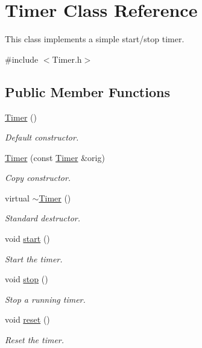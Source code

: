 \hypertarget{class_timer}{}\section{Timer Class Reference}
\label{class_timer}


This class implements a simple start/stop timer.  




{\ttfamily \#include $<$Timer.\+h$>$}

\subsection*{Public Member Functions}
\begin{DoxyCompactItemize}
\item 
\hyperlink{class_timer_a5f16e8da27d2a5a5242dead46de05d97}{Timer} ()
\begin{DoxyCompactList}\small\item\em Default constructor. \end{DoxyCompactList}\item 
\hyperlink{class_timer_a7d1cfb6025c20ad0d56fea2e09a169ec}{Timer} (const \hyperlink{class_timer}{Timer} \&orig)
\begin{DoxyCompactList}\small\item\em Copy constructor. \end{DoxyCompactList}\item 
virtual \hyperlink{class_timer_a14fa469c4c295c5fa6e66a4ad1092146}{$\sim$\+Timer} ()
\begin{DoxyCompactList}\small\item\em Standard destructor. \end{DoxyCompactList}\item 
void \hyperlink{class_timer_a3a8b5272198d029779dc9302a54305a8}{start} ()
\begin{DoxyCompactList}\small\item\em Start the timer. \end{DoxyCompactList}\item 
void \hyperlink{class_timer_a63f0eb44b27402196590a03781515dba}{stop} ()
\begin{DoxyCompactList}\small\item\em Stop a running timer. \end{DoxyCompactList}\item 
void \hyperlink{class_timer_a9020542d73357a4eef512eefaf57524b}{reset} ()
\begin{DoxyCompactList}\small\item\em Reset the timer. \end{DoxyCompactList}\item 

\end{DoxyCompactItemize}
